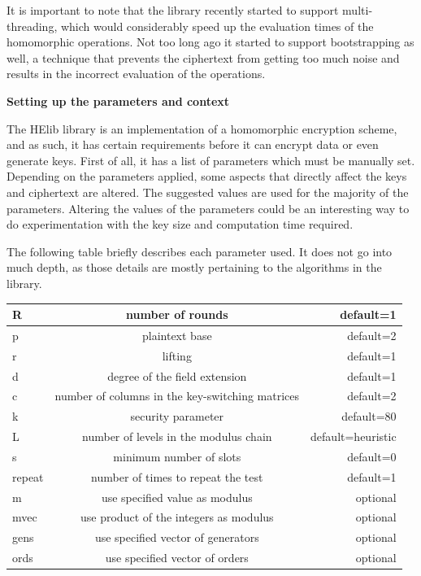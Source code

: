 It is important to note that the library recently started to support multi-threading, which would considerably speed up the evaluation times of the homomorphic operations. Not too long ago it started to support bootstrapping as well, a technique that prevents the ciphertext from getting too much noise and results in the incorrect evaluation of the operations.

\textbf{Setting up the parameters and context}

The HElib library is an implementation of a homomorphic encryption scheme, and as such, it has certain requirements before it can encrypt data or even generate keys. First of all, it has a list of parameters which must be manually set. Depending on the parameters applied, some aspects that directly affect the keys and ciphertext are altered. The suggested values are used for the majority of the parameters. Altering the values of the parameters could be an interesting way to do experimentation with the key size and computation time required.

The following table briefly describes each parameter used. It does not go into much depth, as those details are mostly pertaining to the algorithms in the library.

  \begin{tabular}{|l|c|r|}
    \hline 
    R  &     number of rounds &  default=1     \\ \hline
    p  &     plaintext base  & default=2  \\ \hline
    r  &     lifting  & default=1  \\ \hline
    d  &     degree of the field extension  & default=1  \\ \hline
    c  &     number of columns in the key-switching matrices  & default=2  \\ \hline
    k  &     security parameter & default=80  \\ \hline
    L  &     number of levels in the modulus chain  & default=heuristic  \\ \hline
    s  &     minimum number of slots  & default=0  \\ \hline
    repeat &  number of times to repeat the test & default=1  \\ \hline
    m   &    use specified value as modulus & optional  \\ \hline
    mvec &   use product of the integers as  modulus & optional \\ \hline
    gens &   use specified vector of generators & optional \\ \hline
    ords  &  use specified vector of orders & optional \\ \hline
  \end{tabular}

